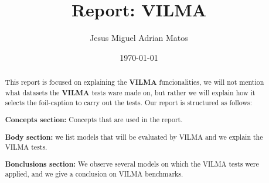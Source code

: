 \documentclass[]{article}
\title{Report: V{\small I}LMA}
\author{Jesus Miguel Adrian Matos}
\date{\today}
\begin{document}
\maketitle

\begin{abstract} 
This report is focused on explaining the \textbf{VILMA} funcionalities, we will not mention what datasets the \textbf{VILMA} tests ware made on, but rather we will explain how it selects the foil-caption to carry out the tests. Our report is structured as follows:

\textbf{Concepts section:} Concepts that are used in the report.

\textbf{Body section:} we list models that will be evaluated by VILMA and we explain the VILMA tests.

\textbf{Bonclusions section:} We observe several models on which the VILMA tests were applied, and we give a conclusion on VILMA benchmarks.




\end{abstract}






\end{document}
